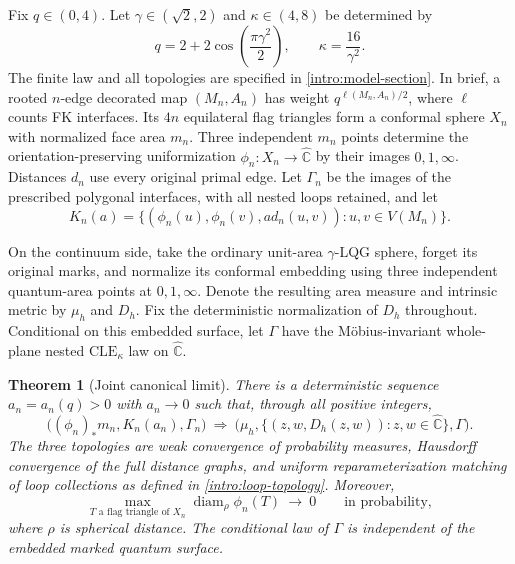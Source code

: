 \documentclass[11pt]{article}
\numberwithin{equation}{section}
\newtheorem{theorem}{Theorem}[section]
\theoremstyle{definition}
\theoremstyle{remark}
\newcommand{\Chat}{\widehat{\mathbb C}}
\newcommand{\1}{\mathbf 1}
\DeclareMathOperator{\diam}{diam}
\begin{document}
Fix $q\in(0,4)$. Let $\gamma\in(\sqrt2,2)$ and $\kappa\in(4,8)$ be
determined by
\begin{equation}\label{intro:parameters}
 q=2+2\cos\!\left(\frac{\pi\gamma^2}{2}\right),
 \qquad \kappa=\frac{16}{\gamma^2}.
\end{equation}
The finite law and all topologies are specified in
\cref{intro:model-section}. In brief, a rooted $n$-edge decorated map
$(M_n,A_n)$ has weight $q^{\ell(M_n,A_n)/2}$, where $\ell$ counts FK
interfaces. Its $4n$ equilateral flag triangles form a conformal sphere
$X_n$ with normalized face area $m_n$. Three independent $m_n$ points
determine the orientation-preserving uniformization
$\phi_n:X_n\to\Chat$ by their images $0,1,\infty$.
Distances $d_n$ use every original primal edge. Let $\Gamma_n$ be the
images of the prescribed polygonal interfaces, with all nested loops
retained, and let
\begin{equation}\label{intro:distance-graph}
 K_n(a)=\{(\phi_n(u),\phi_n(v),a d_n(u,v)):u,v\in V(M_n)\}.
\end{equation}

On the continuum side, take the ordinary unit-area $\gamma$-LQG sphere,
forget its original marks, and normalize its conformal embedding using
three independent quantum-area points at $0,1,\infty$. Denote the
resulting area measure and intrinsic metric by $\mu_h$ and $D_h$.
Fix the deterministic normalization of $D_h$ throughout. Conditional on
this embedded surface, let $\Gamma$ have the M\"obius-invariant whole-plane
nested $\mathrm{CLE}_{\kappa}$ law on $\Chat$.

\begin{theorem}[Joint canonical limit]\label{intro:main}
There is a deterministic sequence
$a_n=a_n(q)>0$ with $a_n\to0$ such that, through all positive integers,
\begin{equation}\label{intro:joint-convergence}
 \big((\phi_n)_*m_n,K_n(a_n),\Gamma_n\big)
 \ \Longrightarrow\
 \big(\mu_h,\{(z,w,D_h(z,w)):z,w\in\Chat\},\Gamma\big).
\end{equation}
The three topologies are weak convergence of probability measures,
Hausdorff convergence of the full distance graphs, and uniform
reparameterization matching of loop collections as defined in
\cref{intro:loop-topology}. Moreover,
\begin{equation}\label{intro:mesh-conclusion}
 \max_{T\text{ a flag triangle of }X_n}
       \diam_{\rho}\phi_n(T)\ \longrightarrow\ 0
 \qquad\text{in probability},
\end{equation}
where $\rho$ is spherical distance. The conditional law of $\Gamma$ is
independent of the embedded marked quantum surface.
\end{theorem}
\end{document}
